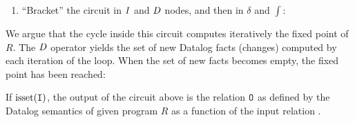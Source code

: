 \begin{algorithm}
\begin{enumerate}[nosep, leftmargin=\parindent]
\item ``Bracket'' the circuit in $\mathit{I}$ and $\mathit{D}$ nodes, and then in $\delta$ and $\int$:

\begin{center}
    \vspace{-2ex}
\end{center}
\end{enumerate}
\end{algorithm}

We argue that the cycle inside this circuit computes iteratively the fixed point of $R$.
The $\mathit{D}$ operator yields the set of new Datalog facts (changes) computed by each iteration of the loop.
When the set of new facts becomes empty, the fixed point has been reached:

\begin{theorem}\label{theorem:recursion}
If $\mbox{isset}(\mbox{\texttt{I}})$, the output of the circuit above is
the relation $\mbox{\texttt{O}}$ as defined by the Datalog semantics of given program
$R$ as a function of the input relation .
\end{theorem}
\label{proof-recursion}

